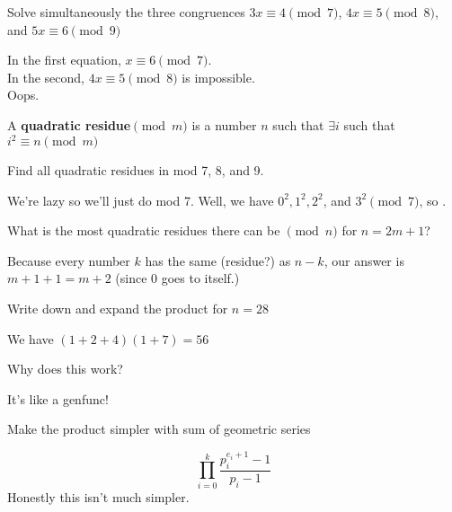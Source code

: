 \documentclass{scrartcl}
\begin{document}
\begin{exercise}
	Solve simultaneously the three congruences $3x \equiv 4 \pmod{7}$, $4x \equiv 5 \pmod{8}$, and $5x \equiv 6 \pmod {9}$
	\begin{soln}
		In the first equation, $x \equiv 6 \pmod{7}$. \\
		In the second, $4x \equiv 5 \pmod{8}$ is impossible.\\
		Oops.
	\end{soln}
\end{exercise}

\begin{definition*}
	A \textbf{quadratic residue}$\pmod{m}$ is a number $n$ such that $\exists i$ such that $i^2 \equiv n \pmod{m}$
\end{definition*}

\begin{exercise}
Find all quadratic residues in mod 7, 8, and 9.
	\begin{soln}
		We're lazy so we'll just do mod 7.
		Well, we have $0^2, 1^2, 2^2$, and $3^2 \pmod{7}$, so .
	\end{soln}
\end{exercise}

\begin{exercise}
	What is the most quadratic residues there can be $\pmod{n}$ for $n=2m+1$?
	\begin{soln}
		Because every number $k$ has the same (residue?) as $n - k$, our answer is $m+1 + 1 = \boxed{m+2}$ (since 0 goes to itself.)
	\end{soln}
\end{exercise}

\setcounter{exercise}{9}

\begin{exercise}
	Write down and expand the product for $n=28$
	\begin{soln}
		We have $(1 + 2 + 4)(1 + 7) = 56$
	\end{soln}
\end{exercise}

\begin{exercise}
	Why does this work?
	\begin{soln}
		It's like a genfunc!
	\end{soln}
\end{exercise}

\begin{exercise}
	Make the product simpler with sum of geometric series
	\begin{soln}
		\[\prod_{i = 0}^k \frac{p_i^{e_i + 1}-1}{p_i - 1}\]
		Honestly this isn't much simpler.
	\end{soln}
\end{exercise}
\end{document}
